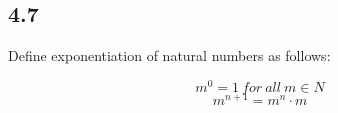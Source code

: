 \subsection*{4.7} Define exponentiation of natural numbers as follows:

$$ m^0 = 1~for~all~m \in N$$
$$ m^{n+1} = m^n \cdot m$$

